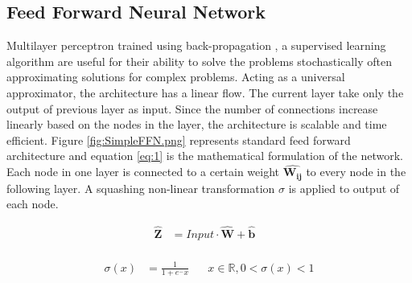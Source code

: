 \documentclass{article}
\let\oldhat\hat
\renewcommand{\hat}[1]{\oldhat{\mathbf{#1}}}
\begin{document}
\subsection{Feed Forward Neural Network}
\label{sssec:ffn}
Multilayer perceptron trained using back-propagation \cite{Rumelhart1986LearningIR}, a supervised learning algorithm are useful for their ability to solve the problems stochastically often approximating solutions for complex problems. Acting as a universal approximator, the architecture has a linear flow. The current layer take only the output of previous layer as input. Since the number of connections increase linearly based on the nodes in the layer, the architecture is scalable and time efficient. Figure \ref{fig:SimpleFFN.png} represents standard feed forward architecture and equation \ref{eq:1} is the mathematical formulation of the network. Each node in one layer is connected to a certain weight $\hat{W_{ij}}$ to every node in the following layer. A squashing non-linear transformation $\sigma$ \cite{Han1995TheIO} is applied to output of each node.


\begin{equation}
\label{eq:1}
\begin{aligned}
\hat{Z} &= Input \cdot \hat{W} + \hat{b}&\\
\end{aligned}
\end{equation}


\begin{equation}
\label{eq:2}
\begin{aligned}
\sigma(x) &= \frac{1}{1+e^-x} \;\;\;\;\;\;  x\in\mathbb{R}, 0<\sigma(x)<1
\end{aligned}
\end{equation}
\end{document}
